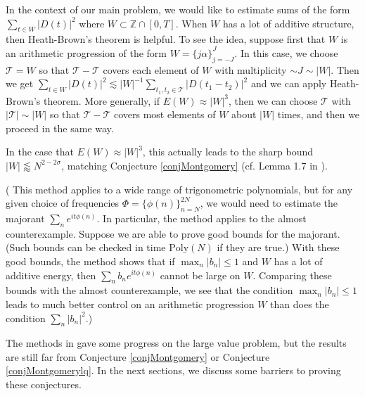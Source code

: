 \documentclass{amsart}
\newcommand{\Poly}{\textrm{Poly}}
\newcommand{\ZZ}{\mathbb{Z}}
\begin{document}
In the context of our main problem, we would like to estimate sums of the form $ \sum_{t \in W} |D(t)|^2$ where $W \subset \ZZ \cap [0, T]$.   When $W$ has a lot of additive structure, then Heath-Brown's theorem is helpful.  
To see the idea, suppose first that $W$ is an arithmetic progression of the form $W = \{ j \alpha \}_{j=-J}^{J}$.    In this case, we choose $\mathcal{T} = W$ so that $\mathcal{T} - \mathcal{T}$ covers each element of $W$ with multiplicity $\sim J \sim |W|$.  Then we get $ \sum_{t \in W} |D(t)|^2 \lesssim |W|^{-1} \sum_{t_1, t_2 \in\mathcal{T}} |D(t_1 - t_2)|^2$ and we can apply Heath-Brown's theorem.  More generally, if $E(W) \approx |W|^3$, then we can choose $\mathcal{T}$ with $|\mathcal{T}| \sim |W|$ so that $\mathcal{T} - \mathcal{T}$ covers most elements of $W$ about $|W|$ times, and then we proceed in the same way.  

In the case that $E(W) \approx |W|^3$, this actually leads to the sharp bound $|W| \lessapprox N^{2 - 2 \sigma}$, matching Conjecture \ref{conjMontgomery} (cf.  Lemma 1.7 in \cite{GM}).

( This method applies to a wide range of trigonometric polynomials,  but for any given choice of frequencies $\Phi = \{ \phi(n) \}_{n=N}^{2N}$,  we would need to estimate the majorant $\sum_{n} e^{ i t \phi(n)}$.   In particular,  the method applies to the almost counterexample.   Suppose we are able to prove good bounds for the majorant.   (Such bounds can be checked in time $\Poly(N)$ if they are true.)   With these good bounds,  the method shows that if $\max_n |b_n| \le 1$ and $W$ has a lot of additive energy,  then $\sum_n b_n e^{i t \phi(n)}$ cannot be large on $W$.   Comparing these bounds with the almost counterexample,  we see that the condition $\max_n |b_n| \le 1$ leads to much better control on an arithmetic progression $W$ than does the condition $\sum_n |b_n|^2$.)
 
 The methods in \cite{GM} gave some progress on the large value problem, but the results are still far from Conjecture \ref{conjMontgomery} or Conjecture \ref{conjMontgomerylq}.  In the next sections, we discuss some barriers to proving these conjectures.   
\end{document}
